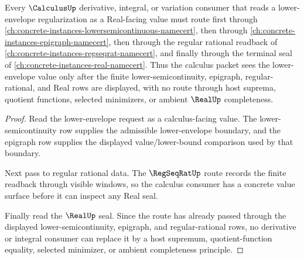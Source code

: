 \begin{lemma}
\label{lem:calculus-lower-envelope-real-facing-route}
Every $\CalculusUp$ derivative, integral, or variation consumer that reads a lower-envelope regularization as a Real-facing value must route first through \autoref{ch:concrete-instances-lowersemicontinuous-namecert}, then through \autoref{ch:concrete-instances-epigraph-namecert}, then through the regular rational readback of \autoref{ch:concrete-instances-regseqrat-namecert}, and finally through the terminal seal of \autoref{ch:concrete-instances-real-namecert}. Thus the calculus packet sees the lower-envelope value only after the finite lower-semicontinuity, epigraph, regular-rational, and Real rows are displayed, with no route through host suprema, quotient functions, selected minimizers, or ambient $\RealUp$ completeness.
\end{lemma}
\begin{proof}
Read the lower-envelope request as a calculus-facing value. The lower-semicontinuity row supplies the admissible lower-envelope boundary, and the epigraph row supplies the displayed value/lower-bound comparison used by that boundary.

Next pass to regular rational data. The $\RegSeqRatUp$ route records the finite readback through visible windows, so the calculus consumer has a concrete value surface before it can inspect any Real seal.

Finally read the $\RealUp$ seal. Since the route has already passed through the displayed lower-semicontinuity, epigraph, and regular-rational rows, no derivative or integral consumer can replace it by a host supremum, quotient-function equality, selected minimizer, or ambient completeness principle.
\end{proof}

